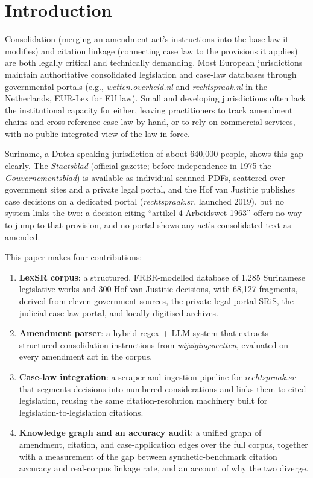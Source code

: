 \documentclass{IOS-Book-Article}
\begin{document}
\section{Introduction}

Consolidation (merging an amendment act's instructions into the base law it modifies) and
citation linkage (connecting case law to the provisions it applies) are both legally
critical and technically demanding. Most European jurisdictions maintain authoritative
consolidated legislation and case-law databases through governmental portals (e.g.,
\emph{wetten.overheid.nl} and \emph{rechtspraak.nl} in the Netherlands, EUR-Lex for EU law). Small and
developing jurisdictions often lack the institutional capacity for either, leaving
practitioners to track amendment chains and cross-reference case law by hand, or to rely
on commercial services, with no public integrated view of the law in force.

Suriname, a Dutch-speaking jurisdiction of about 640,000 people, shows this gap clearly. The \emph{Staatsblad} (official gazette; before
independence in 1975 the \emph{Gouvernementsblad}) is available as
individual scanned PDFs, scattered over government sites and a private legal portal, and the Hof van Justitie
publishes case decisions on a dedicated portal (\emph{rechtspraak.sr}, launched 2019), but no
system links the two: a decision citing ``artikel 4 Arbeidswet 1963'' offers no way to jump to
that provision, and no portal shows any act's consolidated text as amended.

This paper makes four contributions:

\begin{enumerate}
\item \textbf{LexSR corpus}: a structured, FRBR-modelled database of 1,285 Surinamese legislative
   works and 300 Hof van Justitie decisions, with 68,127 fragments, derived from eleven
   government sources, the private legal portal SRiS, the judicial case-law portal, and
   locally digitised archives.
\item \textbf{Amendment parser}: a hybrid regex + LLM system that extracts structured consolidation
   instructions from \emph{wijzigingswetten}, evaluated on every amendment act in the corpus.
\item \textbf{Case-law integration}: a scraper and ingestion pipeline for \emph{rechtspraak.sr} that
   segments decisions into numbered considerations and links them to cited legislation,
   reusing the same citation-resolution machinery built for legislation-to-legislation
   citations.
\item \textbf{Knowledge graph and an accuracy audit}: a unified graph of amendment, citation,
   and case-application edges over the full corpus, together with a measurement of the gap
   between synthetic-benchmark citation accuracy and real-corpus linkage rate, and an
   account of why the two diverge.
\end{enumerate}
\end{document}
